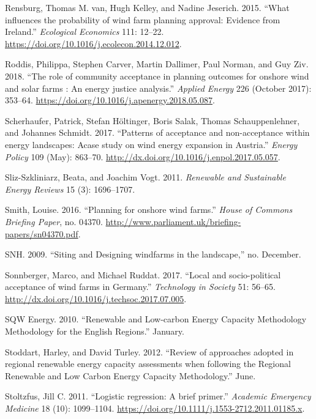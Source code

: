 \documentclass[a4paper,]{article}
\theoremstyle{definition}
\theoremstyle{definition}
\theoremstyle{definition}
\theoremstyle{remark}
\begin{document}
\leavevmode\hypertarget{ref-VanRensburg20}{}%
Rensburg, Thomas M. van, Hugh Kelley, and Nadine Jeserich. 2015. ``What
influences the probability of wind farm planning approval: Evidence from
Ireland.'' \emph{Ecological Economics} 111: 12--22.
\url{https://doi.org/10.1016/j.ecolecon.2014.12.012}.

\leavevmode\hypertarget{ref-Roddis2018}{}%
Roddis, Philippa, Stephen Carver, Martin Dallimer, Paul Norman, and Guy
Ziv. 2018. ``The role of community acceptance in planning outcomes for
onshore wind and solar farms : An energy justice analysis.''
\emph{Applied Energy} 226 (October 2017): 353--64.
\url{https://doi.org/10.1016/j.apenergy.2018.05.087}.

\leavevmode\hypertarget{ref-Scherhaufer2017}{}%
Scherhaufer, Patrick, Stefan Höltinger, Boris Salak, Thomas
Schauppenlehner, and Johannes Schmidt. 2017. ``Patterns of acceptance
and non-acceptance within energy landscapes: Acase study on wind energy
expansion in Austria.'' \emph{Energy Policy} 109 (May): 863--70.
\url{http://dx.doi.org/10.1016/j.enpol.2017.05.057}.

\leavevmode\hypertarget{ref-Sliz-Szkliniarz2011}{}%
Sliz-Szkliniarz, Beata, and Joachim Vogt. 2011. \emph{Renewable and
Sustainable Energy Reviews} 15 (3): 1696--1707.

\leavevmode\hypertarget{ref-Smith2016}{}%
Smith, Louise. 2016. ``Planning for onshore wind farms.'' \emph{House of
Commons Briefing Paper}, no. 04370.
\url{http://www.parliament.uk/briefing-papers/sn04370.pdf}.

\leavevmode\hypertarget{ref-SNH2009}{}%
SNH. 2009. ``Siting and Designing windfarms in the landscape,'' no.
December.

\leavevmode\hypertarget{ref-Sonnberger2017}{}%
Sonnberger, Marco, and Michael Ruddat. 2017. ``Local and socio-political
acceptance of wind farms in Germany.'' \emph{Technology in Society} 51:
56--65. \url{http://dx.doi.org/10.1016/j.techsoc.2017.07.005}.

\leavevmode\hypertarget{ref-SQWEnergy2010}{}%
SQW Energy. 2010. ``Renewable and Low-carbon Energy Capacity Methodology
Methodology for the English Regions.'' January.

\leavevmode\hypertarget{ref-Stoddart2012}{}%
Stoddart, Harley, and David Turley. 2012. ``Review of approaches adopted
in regional renewable energy capacity assessments when following the
Regional Renewable and Low Carbon Energy Capacity Methodology.'' June.

\leavevmode\hypertarget{ref-Stoltzfus2011}{}%
Stoltzfus, Jill C. 2011. ``Logistic regression: A brief primer.''
\emph{Academic Emergency Medicine} 18 (10): 1099--1104.
\url{https://doi.org/10.1111/j.1553-2712.2011.01185.x}.
\end{document}
